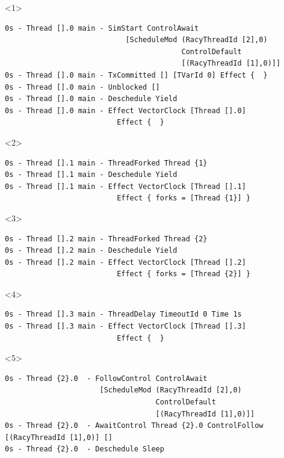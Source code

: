\documentclass[t,x11names,xcolor={x11names},hyperref={colorlinks,citecolor=Blue4,linkcolor=Blue4,anchorcolor=Blue4,urlcolor=Blue4}]{beamer}
\begin{document}
\begin{frame}[fragile]
\begin{columns}
    \begin{column}{0.6\textwidth}
      \tiny
      \begin{onlyenv}<1>
        \begin{verbatim}
0s - Thread [].0 main - SimStart ControlAwait
                            [ScheduleMod (RacyThreadId [2],0)
                                         ControlDefault
                                         [(RacyThreadId [1],0)]]
0s - Thread [].0 main - TxCommitted [] [TVarId 0] Effect {  }
0s - Thread [].0 main - Unblocked []
0s - Thread [].0 main - Deschedule Yield
0s - Thread [].0 main - Effect VectorClock [Thread [].0]
                          Effect {  }
        \end{verbatim}
      \end{onlyenv}
      \begin{onlyenv}<2>
        \begin{verbatim}
0s - Thread [].1 main - ThreadForked Thread {1}
0s - Thread [].1 main - Deschedule Yield
0s - Thread [].1 main - Effect VectorClock [Thread [].1]
                          Effect { forks = [Thread {1}] }
        \end{verbatim}
      \end{onlyenv}
      \begin{onlyenv}<3>
        \begin{verbatim}
0s - Thread [].2 main - ThreadForked Thread {2}
0s - Thread [].2 main - Deschedule Yield
0s - Thread [].2 main - Effect VectorClock [Thread [].2]
                          Effect { forks = [Thread {2}] }
        \end{verbatim}
      \end{onlyenv}
      \begin{onlyenv}<4>
        \begin{verbatim}
0s - Thread [].3 main - ThreadDelay TimeoutId 0 Time 1s
0s - Thread [].3 main - Effect VectorClock [Thread [].3]
                          Effect {  }
        \end{verbatim}
      \end{onlyenv}
      \begin{onlyenv}<5>
        \begin{verbatim}
0s - Thread {2}.0  - FollowControl ControlAwait
                      [ScheduleMod (RacyThreadId [2],0)
                                   ControlDefault
                                   [(RacyThreadId [1],0)]]
0s - Thread {2}.0  - AwaitControl Thread {2}.0 ControlFollow [(RacyThreadId [1],0)] []
0s - Thread {2}.0  - Deschedule Sleep
        \end{verbatim}

\end{onlyenv}
\end{column}
\end{columns}
\end{frame}
\end{document}
